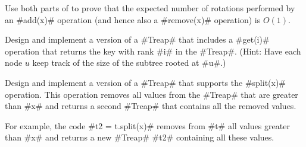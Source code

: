 \begin{exc}
 Use both parts of  to prove that the expected number of rotations performed by an #add(x)# operation (and hence also a #remove(x)# operation) is $O(1)$.
\end{exc}

\begin{exc}
 Design and implement a version of a #Treap# that includes a #get(i)# operation that returns the key with rank #i# in the #Treap#.  (Hint: Have each node $u$ keep track of the size of the subtree rooted at #u#.)
\end{exc}

\begin{exc}
 Design and implement a version of a #Treap# that supports the
#split(x)# operation.  This operation removes all values from the #Treap#
that are greater than #x# and returns a second #Treap# that contains all
the removed values.  
\end{exc}

\begin{exc}
For example, the code #t2 = t.split(x)# removes from #t# all values
greater than #x# and returns a new #Treap# #t2# containing all these
values.
\end{exc}

